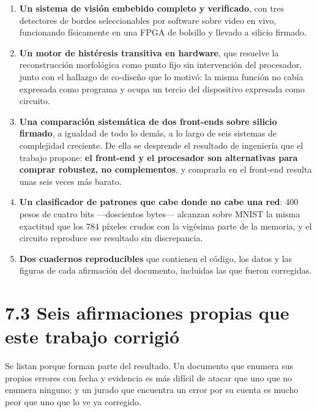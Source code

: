 \begin{enumerate}
\def\labelenumi{\arabic{enumi}.}
\item
  \textbf{Un sistema de visión embebido completo y verificado}, con tres
  detectores de bordes seleccionables por software sobre video en vivo,
  funcionando físicamente en una FPGA de bolsillo y llevado a silicio
  firmado.
\item
  \textbf{Un motor de histéresis transitiva en hardware}, que resuelve
  la reconstrucción morfológica como punto fijo sin intervención del
  procesador, junto con el hallazgo de co-diseño que lo motivó: la misma
  función no cabía expresada como programa y ocupa un tercio del
  dispositivo expresada como circuito.
\item
  \textbf{Una comparación sistemática de dos front-ends sobre silicio
  firmado}, a igualdad de todo lo demás, a lo largo de seis sistemas de
  complejidad creciente. De ella se desprende el resultado de ingeniería
  que el trabajo propone: \textbf{el front-end y el procesador son
  alternativas para comprar robustez, no complementos}, y comprarla en
  el front-end resulta unas seis veces más barato.
\item
  \textbf{Un clasificador de patrones que cabe donde no cabe una red}:
  400 pesos de cuatro bits ---doscientos bytes--- alcanzan sobre MNIST
  la misma exactitud que los 784 píxeles crudos con la vigésima parte de
  la memoria, y el circuito reproduce ese resultado sin discrepancia.
\item
  \textbf{Dos cuadernos reproducibles} que contienen el código, los
  datos y las figuras de cada afirmación del documento, incluidas las
  que fueron corregidas.
\end{enumerate}

\section{7.3 Seis afirmaciones propias que este trabajo
corrigió}\label{seis-afirmaciones-propias-que-este-trabajo-corrigiuxf3}

Se listan porque forman parte del resultado. Un documento que enumera
sus propios errores con fecha y evidencia es más difícil de atacar que
uno que no enumera ninguno; y un jurado que encuentra un error por su
cuenta es mucho peor que uno que lo ve ya corregido.

